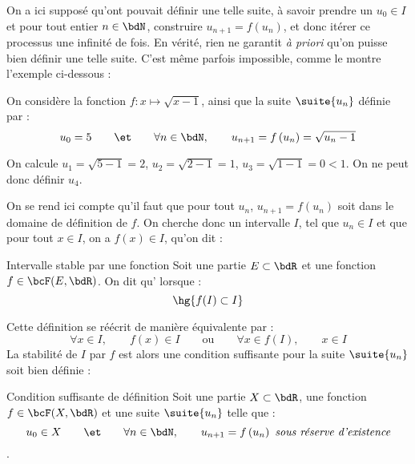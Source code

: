\documentclass[a4paper,french,bookmarks]{article}
\begin{document}
On a ici supposé qu'ont pouvait définir une telle suite, à savoir prendre un \(u_0 \in I\) et pour tout entier \(n \in \bdN\), construire \(u_{n+1} = f(u_n)\), et donc itérer ce processus une infinité de fois. En vérité, rien ne garantit \textit{à priori} qu'on puisse bien définir une telle suite. C'est même parfois impossible, comme le montre l'exemple ci-dessous :

\begin{example}{}{}
    On considère la fonction \(f : x \mapsto \sqrt{x - 1}\), ainsi que la suite \(\suite{u_n}\) définie par :
    \[ u_0 = 5 \qquad\et\qquad \forall n \in \bdN,\qquad u_{n+1} = f\left(u_n\right) = \sqrt{u_n - 1}\]
    
    \tcblower
    
    \begin{enumerate}
        \ithand On calcule \(u_1 = \sqrt{5 - 1} = 2\), \( u_2 = \sqrt{2 - 1} = 1\), \( u_3 = \sqrt{1 - 1} = 0 < 1\). On ne peut donc définir $u_4$.
    \end{enumerate}
\end{example}

On se rend ici compte qu'il faut que pour tout \(u_n\), \(u_{n+1} = f(u_n)\) soit dans le domaine de définition de \(f\). On cherche donc un intervalle \(I\), tel que \(u_n \in I\) et que pour tout \(x \in I\), on a \( f(x) \in I\), qu'on dit  :

\begin{definition}{Intervalle stable par une fonction}{}
    Soit une partie \(E \subset \bdR\) et une fonction \(f \in \bcF(E, \bdR)\). On dit qu' lorsque :
    \[ \hg{f(I) \subset I}\]
\end{definition}

Cette définition se réécrit de manière équivalente par :
%
\[ \forall x \in I,\qquad f(x) \in I \qquad\text{ou}\qquad \forall x \in f(I),\qquad x \in I\]
%
La stabilité de \(I\) par \(f\) est alors une condition suffisante pour la suite \(\suite{u_n}\) soit bien définie :

\begin{property}{Condition suffisante de définition}{}
    Soit une partie \(X \subset \bdR\), une fonction \(f \in \bcF(X, \bdR)\) et une suite \(\suite{u_n}\) telle que :
    \[ u_0 \in X \qquad\et\qquad \forall n \in \bdN,\qquad u_{n+1} = f\left(u_n\right) \ \textit{sous réserve d'existence}\]
    .
\end{property}
\end{document}

